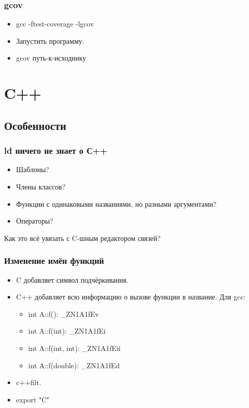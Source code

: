 \documentclass[hyperref={unicode=true}]{beamer}
\begin{document}

\begin{frame}
\frametitle{gcov}
\begin{itemize}
\item gcc -ftest-coverage -lgcov
\item Запустить программу. 
\item gcov путь-к-исходнику
\end{itemize}
\end{frame}



\section{C++}
\subsection{Особенности}
\begin{frame}
\frametitle{ld ничего не знает о С++}
\begin{itemize}
\item Шаблоны?
\item Члены классов?
\item Функции с одинаковыми названиями, но разными аргументами?
\item Операторы?
\end{itemize}

Как это всё увязать с C-шным редактором связей?
\end{frame}

\begin{frame}
\frametitle{Изменение имён функций}
\begin{itemize}
\item C добавляет символ подчёркивания. 
\item C++ добавляет всю информацию о вызове функции в название. Для gcc:
\begin{itemize}
  \item int A::f(): \_ZN1A1fEv
  \item int A::f(int): \_ZN1A1fEi
  \item int A::f(int, int): \_ZN1A1fEii
  \item int A::f(double): \_ZN1A1fEd
\end{itemize}
\item c++filt.
\item export "C"
\end{itemize}
\end{frame}
\end{document}
